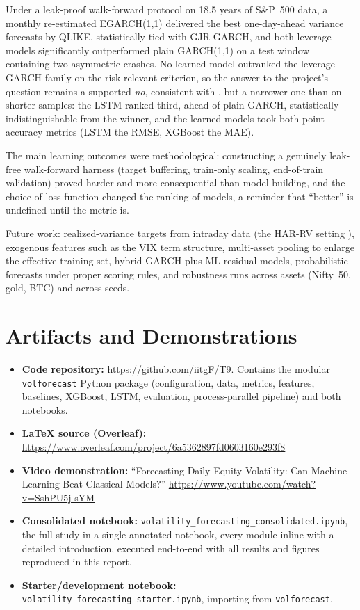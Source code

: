 \documentclass[a4paper,twocolumn,10pt]{article}
\begin{document}
Under a leak-proof walk-forward protocol on 18.5 years of S\&P~500 data, a monthly re-estimated EGARCH(1,1) delivered the best one-day-ahead variance forecasts by QLIKE, statistically tied with GJR-GARCH, and both leverage models significantly outperformed plain GARCH(1,1) on a test window containing two asymmetric crashes. No learned model outranked the leverage GARCH family on the risk-relevant criterion, so the answer to the project's question remains a supported \emph{no}, consistent with \cite{hansen2005}, but a narrower one than on shorter samples: the LSTM ranked third, ahead of plain GARCH, statistically indistinguishable from the winner, and the learned models took both point-accuracy metrics (LSTM the RMSE, XGBoost the MAE).

The main learning outcomes were methodological: constructing a genuinely leak-free walk-forward harness (target buffering, train-only scaling, end-of-train validation) proved harder and more consequential than model building, and the choice of loss function changed the ranking of models, a reminder that ``better'' is undefined until the metric is.

Future work: realized-variance targets from intraday data (the HAR-RV setting \cite{corsi2009}), exogenous features such as the VIX term structure, multi-asset pooling to enlarge the effective training set, hybrid GARCH-plus-ML residual models, probabilistic forecasts under proper scoring rules, and robustness runs across assets (Nifty~50, gold, BTC) and across seeds.

\section{Artifacts and Demonstrations}

\begin{itemize}
  \item \textbf{Code repository:} \url{https://github.com/iitgF/T9}. Contains the modular \texttt{volforecast} Python package (configuration, data, metrics, features, baselines, XGBoost, LSTM, evaluation, process-parallel pipeline) and both notebooks.
  \item \textbf{LaTeX source (Overleaf):} \url{https://www.overleaf.com/project/6a5362897fd0603160e293f8}
  \item \textbf{Video demonstration:} ``Forecasting Daily Equity Volatility: Can Machine Learning Beat Classical Models?'' \url{https://www.youtube.com/watch?v=SshPU5j-sYM}
  \item \textbf{Consolidated notebook:} \texttt{volatility\_forecasting\_consolidated.ipynb}, the full study in a single annotated notebook, every module inline with a detailed introduction, executed end-to-end with all results and figures reproduced in this report.
  \item \textbf{Starter/development notebook:} \texttt{volatility\_forecasting\_starter.ipynb}, importing from \texttt{volforecast}.
\end{itemize}
\end{document}
